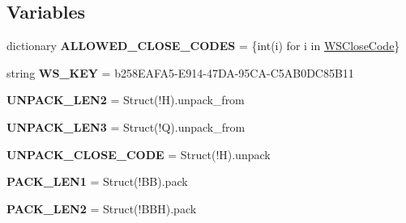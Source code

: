 \subsection*{Variables}
\begin{DoxyCompactItemize}
\item 
\mbox{\label{namespaceaiohttp_1_1http__websocket_a07098798da5c7d501ec57302d39a5ce0}} 
dictionary {\bfseries A\+L\+L\+O\+W\+E\+D\+\_\+\+C\+L\+O\+S\+E\+\_\+\+C\+O\+D\+ES} = \{int(i) for i in \hyperlink{classaiohttp_1_1http__websocket_1_1_w_s_close_code}{W\+S\+Close\+Code}\}
\item 
\mbox{\label{namespaceaiohttp_1_1http__websocket_a5cc531a18fe7fa0cb99be19996267f6e}} 
string {\bfseries W\+S\+\_\+\+K\+EY} = b\textquotesingle{}258\+E\+A\+F\+A5-\/\+E914-\/47\+D\+A-\/95\+C\+A-\/\+C5\+A\+B0\+D\+C85\+B11\textquotesingle{}
\item 
\mbox{\label{namespaceaiohttp_1_1http__websocket_a3445712a7a06ef6b602f04edc8ca6498}} 
{\bfseries U\+N\+P\+A\+C\+K\+\_\+\+L\+E\+N2} = Struct(\textquotesingle{}!H\textquotesingle{}).unpack\+\_\+from
\item 
\mbox{\label{namespaceaiohttp_1_1http__websocket_a8bd5f8b9ffaf302ec48e21fa4cb602c6}} 
{\bfseries U\+N\+P\+A\+C\+K\+\_\+\+L\+E\+N3} = Struct(\textquotesingle{}!Q\textquotesingle{}).unpack\+\_\+from
\item 
\mbox{\label{namespaceaiohttp_1_1http__websocket_abb6017a3d87ae1eddd6000583289d0ab}} 
{\bfseries U\+N\+P\+A\+C\+K\+\_\+\+C\+L\+O\+S\+E\+\_\+\+C\+O\+DE} = Struct(\textquotesingle{}!H\textquotesingle{}).unpack
\item 
\mbox{\label{namespaceaiohttp_1_1http__websocket_a0e8e25a728a806c0bf63dd3c64713de3}} 
{\bfseries P\+A\+C\+K\+\_\+\+L\+E\+N1} = Struct(\textquotesingle{}!BB\textquotesingle{}).pack
\item 
\mbox{\label{namespaceaiohttp_1_1http__websocket_a1984c394d3fb9e07c90d45eeae359b1f}} 
{\bfseries P\+A\+C\+K\+\_\+\+L\+E\+N2} = Struct(\textquotesingle{}!B\+BH\textquotesingle{}).pack

\end{DoxyCompactItemize}
